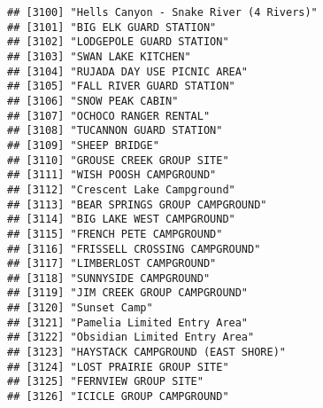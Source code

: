 \documentclass[
]{article}
\begin{document}
\begin{verbatim}
## [3100] "Hells Canyon - Snake River (4 Rivers)"                                               
## [3101] "BIG ELK GUARD STATION"                                                               
## [3102] "LODGEPOLE GUARD STATION"                                                             
## [3103] "SWAN LAKE KITCHEN"                                                                   
## [3104] "RUJADA DAY USE PICNIC AREA"                                                          
## [3105] "FALL RIVER GUARD STATION"                                                            
## [3106] "SNOW PEAK CABIN"                                                                     
## [3107] "OCHOCO RANGER RENTAL"                                                                
## [3108] "TUCANNON GUARD STATION"                                                              
## [3109] "SHEEP BRIDGE"                                                                        
## [3110] "GROUSE CREEK GROUP SITE"                                                             
## [3111] "WISH POOSH CAMPGROUND"                                                               
## [3112] "Crescent Lake Campground"                                                            
## [3113] "BEAR SPRINGS GROUP CAMPGROUND"                                                       
## [3114] "BIG LAKE WEST CAMPGROUND"                                                            
## [3115] "FRENCH PETE CAMPGROUND"                                                              
## [3116] "FRISSELL CROSSING CAMPGROUND"                                                        
## [3117] "LIMBERLOST CAMPGROUND"                                                               
## [3118] "SUNNYSIDE CAMPGROUND"                                                                
## [3119] "JIM CREEK GROUP CAMPGROUND"                                                          
## [3120] "Sunset Camp"                                                                         
## [3121] "Pamelia Limited Entry Area"                                                          
## [3122] "Obsidian Limited Entry Area"                                                         
## [3123] "HAYSTACK CAMPGROUND (EAST SHORE)"                                                    
## [3124] "LOST PRAIRIE GROUP SITE"                                                             
## [3125] "FERNVIEW GROUP SITE"                                                                 
## [3126] "ICICLE GROUP CAMPGROUND"                                                             

\end{verbatim}
\end{document}
